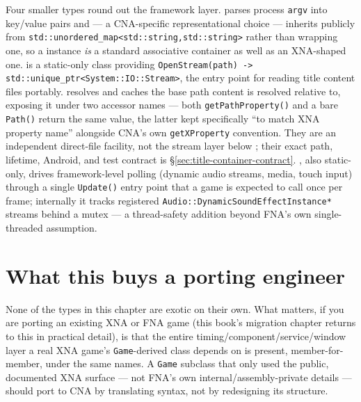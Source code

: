 Four smaller types round out the framework layer.  parses process
\texttt{argv} into key/value pairs and --- a CNA-specific representational choice --- inherits
publicly from \texttt{std::unordered\_map<std::string,std::string>} rather than wrapping one,
so a  instance \emph{is} a standard associative container as well
as an XNA-shaped one.  is a static-only class providing
\texttt{OpenStream(path) -> std::unique\_ptr<System::IO::Stream>}, the entry point for
reading title content files portably.  resolves and caches the base
path content is resolved relative to, exposing it under two accessor names --- both
\texttt{getPathProperty()} and a bare \texttt{Path()} return the same value, the latter kept
specifically ``to match XNA property name'' alongside CNA's own \texttt{getXProperty}
convention. They are an independent direct-file facility, not the stream layer below
; their exact path, lifetime, Android, and test contract is
\S\ref{sec:title-container-contract}. , also static-only, drives framework-level polling
(dynamic audio streams, media, touch input) through a single \texttt{Update()} entry point
that a game is expected to call once per frame; internally it tracks registered
\texttt{Audio::DynamicSoundEffectInstance*} streams behind a mutex --- a thread-safety
addition beyond FNA's own single-threaded assumption.

\section{What this buys a porting engineer}

None of the types in this chapter are exotic on their own. What matters, if you are porting
an existing XNA or FNA game (this book's migration chapter returns to this in practical
detail), is that the entire timing/component/service/window layer a real XNA game's
\texttt{Game}-derived class depends on is present, member-for-member, under the same names.
A \texttt{Game} subclass that only used the public, documented XNA surface --- not FNA's own
internal/assembly-private details --- should port to CNA by translating syntax, not by
redesigning its structure.

